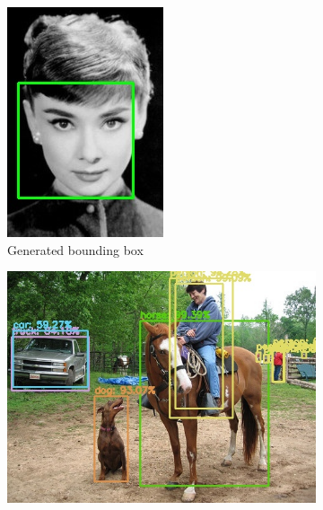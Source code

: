\begin{figure}[!h]
\begin{subfigure}{.14\linewidth}
		\includegraphics[width=0.9\linewidth]{images/img1_withNMS}
		\caption{Generated bounding box}
		\label{fig:sub_withNMS}
	\end{subfigure}
	\begin{subfigure}{.35\linewidth}
		\includegraphics[width=0.9\linewidth]{images/ex2_yolo_noNMS}

\end{subfigure}
\end{figure}
